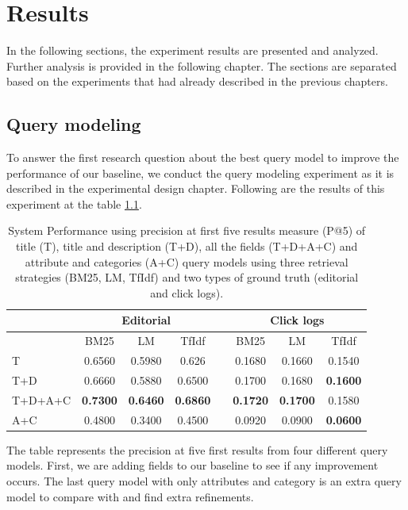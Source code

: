 \chapter{Results}

In the following sections, the experiment results are presented and analyzed. Further analysis is provided in the following chapter. The sections are separated based on the experiments that had already described in the previous chapters.

\section{Query modeling}

To answer the first research question about the best query model to improve the performance of our baseline, we conduct the query modeling experiment as it is described in the experimental design chapter. Following are the results of this experiment at the table \ref{table:qmP5}.

\begin{table}[H]
\begin{center}
\caption{System Performance using precision at first five results measure (P@5) of title (T), title and description (T+D), all the fields (T+D+A+C) and attribute and categories (A+C) query models using three retrieval strategies (BM25, LM, TfIdf) and two types of ground truth (editorial and click logs).}
\label{table:qmP5}

\begin{tabular}{lccccccc}
\toprule
 & \multicolumn{3}{c}{Editorial} & & \multicolumn{3}{c}{Click logs} \\
\midrule
& BM25 & LM & TfIdf &   & BM25 & LM & TfIdf \\
\midrule
T & 0.6560 &  0.5980 & 0.626 &   &         		0.1680 & 0.1660 & 0.1540 \\
T+D & 0.6660 & 0.5880 & 0.6500 &   &    			0.1700 & 0.1680 & \textbf{0.1600} \\
T+D+A+C & \textbf{0.7300} & \textbf{0.6460} & \textbf{0.6860} &   & \textbf{0.1720} & \textbf{0.1700} & 0.1580 \\
A+C & 0.4800 & 0.3400 & 0.4500 &   &     			0.0920 & 0.0900 & \textbf{0.0600} \\
\bottomrule
\end{tabular}
\end{center}
\end{table}

The table represents the precision at five first results from four different query models. First, we are adding fields to our baseline to see if any improvement occurs. The last query model with only attributes and category is an extra query model to compare with and find extra refinements.

